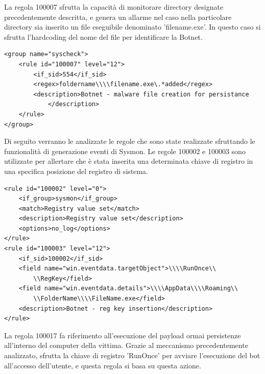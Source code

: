 La regola 100007 sfrutta la capacità di monitorare directory designate precedentemente descritta, e genera un allarme nel caso nella particolare directory sia inserito un file eseguibile denominato 'filename.exe'. In questo caso si sfrutta l'hardcoding del nome del file per identificare la Botnet.
\begin{lstlisting}
<group name="syscheck">
    <rule id="100007" level="12">
        <if_sid>554</if_sid>
        <regex>foldername\\\\filename.exe\.*added</regex>
        <description>Botnet - malware file creation for persistance 
            </description>
    </rule>
</group>
\end{lstlisting}

Di seguito verranno le analizzate le regole che sono state realizzate sfruttando le funzionalità di generazione eventi di Sysmon.
Le regole 100002 e 100003 sono utilizzate per allertare che è stata inserita una determinata chiave di registro in una specifica posizione del registro di sistema. 

\begin{lstlisting}
<rule id="100002" level="0">
    <if_group>sysmon</if_group>
    <match>Registry value set</match>
    <description>Registry value set</description>
    <options>no_log</options>
</rule>
<rule id="100003" level="12">
    <if_sid>100002</if_sid>
    <field name="win.eventdata.targetObject">\\\\RunOnce\\
        \\RegKey</field>
    <field name="win.eventdata.details">\\\\AppData\\\\Roaming\\
        \\FolderName\\\\FileName.exe</field>
    <description>Botnet - reg key insertion</description>
</rule>

\end{lstlisting}

La regola 100017 fa riferimento all'esecuzione del payload ormai persistenze all'interno del computer della vittima. Grazie al meccanismo precedentemente analizzato, sfrutta la chiave di registro 'RunOnce' per avviare l'esecuzione del bot all'accesso dell'utente, e questa regola si basa su questa azione.

